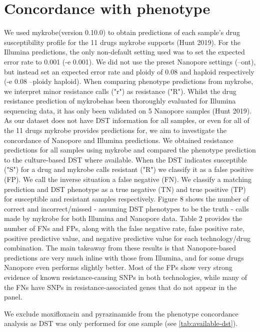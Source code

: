 \section{Concordance with phenotype}

We used mykrobe(version 0.10.0) to obtain predictions of each sample's drug susceptibility profile for the 11 drugs mykrobe supports (Hunt 2019). For the Illumina predictions, the only non-default setting used was to set the expected error rate to 0.001 (-e 0.001). We did not use the preset Nanopore settings (--ont), but instead set an expected error rate and ploidy of 0.08 and haploid respectively (-e 0.08 --ploidy haploid).
When comparing phenotype predictions from mykrobe, we interpret minor resistance calls ("r") as resistance ("R").
Whilst the drug resistance prediction of mykrobehas been thoroughly evaluated for Illumina sequencing data, it has only been validated on 5 Nanopore samples (Hunt 2019). As our dataset does not have DST information for all samples, or even for all of the 11 drugs mykrobe provides predictions for, we aim to investigate the concordance of Nanopore and Illumina predictions. 
We obtained resistance predictions for all samples using mykrobe and compared the phenotype prediction to the culture-based DST where available. When the DST indicates susceptible ("S") for a drug and mykrobe calls resistant ("R") we classify it as a false positive (FP). We call the inverse situation a false negative (FN). We classify a matching prediction and DST phenotype as a true negative (TN) and true positive (TP) for susceptible and resistant samples respectively.
Figure 8 shows the number of correct and incorrect/missed - assuming DST phenotypes to be the truth - calls made by mykrobe for both Illumina and Nanopore data. Table 2 provides the number of FNs and FPs, along with the false negative rate, false positive rate, positive predictive value, and negative predictive value for each technology/drug combination. The main takeaway from these results is that Nanopore-based predictions are very much inline with those from Illumina, and for some drugs Nanopore even performs slightly better.
Most of the FPs show very strong evidence of known resistance-causing SNPs in both technologies, while many of the FNs have SNPs in resistance-associated genes that do not appear in the panel.  



We exclude moxifloxacin and pyrazinamide from the phenotype concordance analysis as DST was only performed for one sample (see \autoref{tab:available-dst}).

